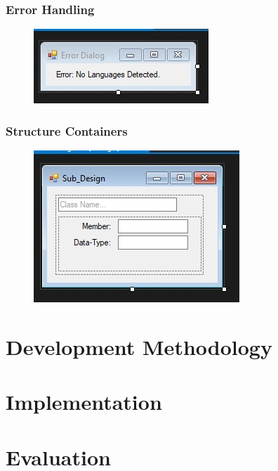 \documentclass[12pt]{report} %
\begin{document}
			\subsection{Error Handling}
				\begin{figure}[H]
					{\includegraphics[scale=0.75]{Figures/vp-designs/NET_Framework-GUI-ErrorDialog.jpg}}
				\end{figure}
			\subsection{Structure Containers}
				\begin{figure}[H]
					{\includegraphics[scale=0.75]{Figures/vp-designs/NET_Framework-GUI-2.jpg}}
				\end{figure}
	\chapter{Development Methodology}

	\chapter{Implementation}
	
	\chapter{Evaluation}
\end{document}
